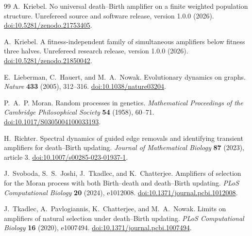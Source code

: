 \documentclass[11pt]{article}
\theoremstyle{definition}
\theoremstyle{remark}
\begin{document}
\begin{thebibliography}{99}
A.~Kriebel.
No universal death--Birth amplifier on a finite weighted population
structure.  Unrefereed source and software release, version 1.0.0 (2026).
\href{https://doi.org/10.5281/zenodo.21753405}
{doi:10.5281/zenodo.21753405}.

A.~Kriebel.
A fitness-independent family of simultaneous amplifiers below fitness three
halves.  Unrefereed research release, version 1.0.0 (2026).
\href{https://doi.org/10.5281/zenodo.21850042}
{doi:10.5281/zenodo.21850042}.

E.~Lieberman, C.~Hauert, and M.~A.~Nowak.
Evolutionary dynamics on graphs.
\emph{Nature} \textbf{433} (2005), 312--316.
\href{https://doi.org/10.1038/nature03204}{doi:10.1038/nature03204}.

P.~A.~P. Moran.
Random processes in genetics.
\emph{Mathematical Proceedings of the Cambridge Philosophical Society}
\textbf{54} (1958), 60--71.
\href{https://doi.org/10.1017/S0305004100033193}
{doi:10.1017/S0305004100033193}.

H.~Richter.
Spectral dynamics of guided edge removals and identifying transient
amplifiers for death--Birth updating.
\emph{Journal of Mathematical Biology} \textbf{87} (2023), article 3.
\href{https://doi.org/10.1007/s00285-023-01937-1}
{doi:10.1007/s00285-023-01937-1}.

J.~Svoboda, S.~S.~Joshi, J.~Tkadlec, and K.~Chatterjee.
Amplifiers of selection for the Moran process with both Birth--death and
death--Birth updating.
\emph{PLoS Computational Biology} \textbf{20} (2024), e1012008.
\href{https://doi.org/10.1371/journal.pcbi.1012008}
{doi:10.1371/journal.pcbi.1012008}.

J.~Tkadlec, A.~Pavlogiannis, K.~Chatterjee, and M.~A.~Nowak.
Limits on amplifiers of natural selection under death--Birth updating.
\emph{PLoS Computational Biology} \textbf{16} (2020), e1007494.
\href{https://doi.org/10.1371/journal.pcbi.1007494}
{doi:10.1371/journal.pcbi.1007494}.

\end{thebibliography}
\end{document}
